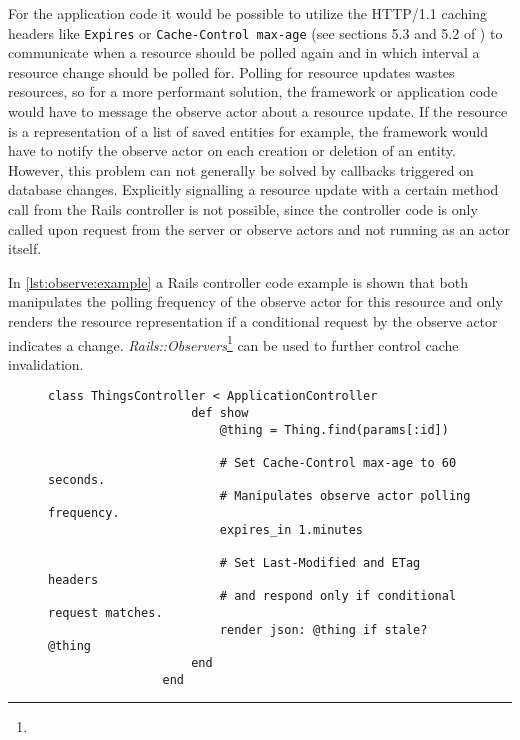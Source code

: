 		For the application code it would be possible to utilize the HTTP/1.1
		caching headers like \texttt{Expires} or \texttt{Cache-Control max-age}
		(see sections 5.3 and 5.2 of \cite{http-4}) to communicate when a
		resource should be polled again and in which interval a resource change
		should be polled for. Polling for resource updates wastes resources, so
		for a more performant solution, the framework or application code would
		have to message the observe actor about a resource update. If the
		resource is a representation of a list of saved entities for example,
		the framework would have to notify the observe actor on each creation
		or deletion of an entity. However, this problem can not generally be
		solved by callbacks triggered on database changes. Explicitly
		signalling a resource update with a certain method call from the
		\ac{Rails} controller is not possible, since the controller code is
		only called upon request from the server or observe actors and not
		running as an actor itself.

		In \autoref{lst:observe:example} a \ac{Rails} controller code
		example is shown that both manipulates the polling frequency of the
		observe actor for this resource and only renders the resource
		representation if a conditional request by the observe actor indicates
		a change. \emph{\ac{Rails}::Observers}\footnote{\urlRailsObservers} can
		be used to further control cache invalidation.


		\begin{figure}
			\begin{lstlisting}[gobble=8,caption={Caching options in \ac{Rails} controller},label={lst:observe:example}]
				class ThingsController < ApplicationController
					def show
						@thing = Thing.find(params[:id])

						# Set Cache-Control max-age to 60 seconds.
						# Manipulates observe actor polling frequency.
						expires_in 1.minutes

						# Set Last-Modified and ETag headers
						# and respond only if conditional request matches.
						render json: @thing if stale? @thing
					end
				end
			\end{lstlisting}
		\end{figure}


